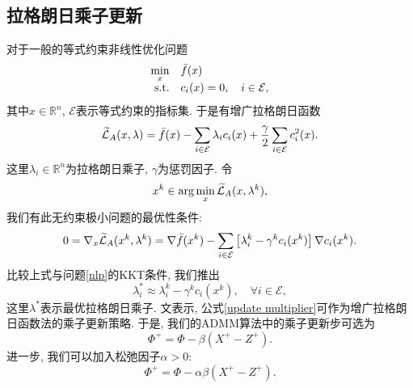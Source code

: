 \subsection{拉格朗日乘子更新}\label{update multiplier1}
对于一般的等式约束非线性优化问题
\begin{equation}\begin{array}{rl}
\min\limits_x & \bar f(x)\\
\mathrm{s.t.} & c_i(x)=0,\quad i\in\mathcal{E},
\end{array}\label{nlp}\end{equation}
其中$x\in\mathbb{R}^n$, $\mathcal{E}$表示等式约束的指标集. 于是有增广拉格朗日函数
$$\widetilde{\mathcal{L}}_A(x,\lambda)=\bar f(x)-\sum\limits_{i\in\mathcal{E}}\lambda_ic_i(x)+\frac{\gamma}{2}\sum\limits_{i\in\mathcal{E}}c_i^2(x).$$
这里$\lambda_i\in\mathbb{R}^n$为拉格朗日乘子, $\gamma$为惩罚因子. 令
$$x^k\in\arg\min\limits_x\widetilde{\mathcal{L}}_A(x,\lambda^k),$$
我们有此无约束极小问题的最优性条件:
$$0=\nabla_x\widetilde{\mathcal{L}}_A(x^k,\lambda^k)=\nabla \bar f(x^k)-\sum\limits_{i\in\mathcal{E}}\left[\lambda_i^k-\gamma^kc_i(x^k)\right]\nabla c_i(x^k).$$
比较上式与问题\eqref{nlp}的KKT条件, 我们推出
\begin{equation}\lambda_i^*\approx\lambda_i^k-\gamma^kc_i(x^k),\quad\forall i\in\mathcal{E},\label{update multiplier}\end{equation}
这里$\lambda^*$表示最优拉格朗日乘子. 文\cite{Nocedal2006Numerical}表示, 公式\eqref{update multiplier}可作为增广拉格朗日函数法的乘子更新策略. 于是, 我们的ADMM算法中的乘子更新步可选为
\begin{equation}
\Phi^+=\Phi-\beta(X^+-Z^+).
\label{update ADMM multiplier X block}
\end{equation}
进一步, 我们可以加入松弛因子$\alpha>0$:
\begin{equation}
\Phi^+=\Phi-\alpha\beta(X^+-Z^+).
\label{relax update X block}
\end{equation}

